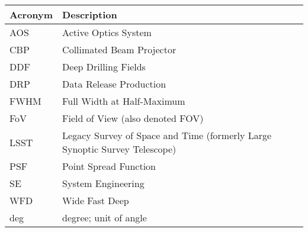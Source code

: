 \addtocounter{table}{-1}
\begin{longtable}{p{}p{}}\hline
\textbf{Acronym} & \textbf{Description}  \\\hline

AOS & Active Optics System \\\hline
CBP & Collimated Beam Projector \\\hline
DDF & Deep Drilling Fields \\\hline
DRP & Data Release Production \\\hline
FWHM & Full Width at Half-Maximum \\\hline
FoV & Field of View (also denoted FOV) \\\hline
LSST & Legacy Survey of Space and Time (formerly Large Synoptic Survey Telescope) \\\hline
PSF & Point Spread Function \\\hline
SE & System Engineering \\\hline
WFD & Wide Fast Deep \\\hline
deg & degree; unit of angle \\\hline
\end{longtable}
